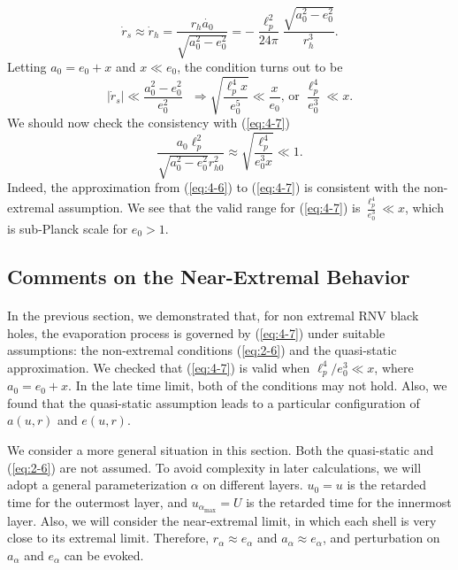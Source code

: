 \documentclass[letterpaper,12pt]{article}
\begin{document}
\begin{equation}\label{eq:4-8}
\dot{r}_{s} \approx \dot{r}_{h} = \frac{r_{h}\dot{a_{0}}}{\sqrt{a_{0}^{2}-e_{0}^{2}}}= -\frac{\ell_{p}^{2}}{24\pi}\frac{\sqrt{a_{0}^{2}-e_{0}^2}}{r_{h}^{3}}.
\end{equation}
Letting $a_{0} = e_{0} + x$ and $x \ll e_{0}$, the condition turns out to be
\begin{equation}\label{eq:4-9}
 |\dot{r}_{s}| \ll \frac{a_{0}^2-e_{0}^2}{e_{0}^2} \textrm{ } \Rightarrow \sqrt{\frac{\ell^{4}_{p}x}{e_{0}^{5}}} \ll \frac{x}{e_{0}} \textrm{, or } \frac{\ell_{p}^{4}}{e_{0}^{3}} \ll x.
 \end{equation}
 We should now check the consistency with (\ref{eq:4-7})
\begin{equation}
\frac{a_{0}\ell_{p}^{2}}{\sqrt{a_{0}^{2}-e_{0}^{2}}r_{h0}^{2}} \approx \sqrt{\frac{\ell_{p}^{4}}{e_{0}^{3}x}} \ll 1.
\end{equation}
Indeed, the approximation from (\ref{eq:4-6}) to (\ref{eq:4-7}) is consistent with the non-extremal assumption. We see that the valid range for (\ref{eq:4-7}) is $\frac{\ell_{p}^{4}}{e_{0}^{3}} \ll x$, which is sub-Planck scale for $e_{0} > 1$. 

\subsection{Comments on the Near-Extremal Behavior}
\label{sec:4-2}
\paragraph{ }
In the previous section, we demonstrated that, for non extremal RNV black holes, the evaporation process is governed by (\ref{eq:4-7}) under suitable assumptions: the non-extremal conditions (\ref{eq:2-6}) and the quasi-static approximation. We checked that (\ref{eq:4-7}) is valid when $\ell_{p}^{4} \slash e_{0}^{3} \ll x$, where $a_{0} = e_{0} + x$. In the late time limit, both of the conditions may not hold. Also, we found that the quasi-static assumption leads to a particular configuration of $a(u, r)$ and $e(u, r)$.

We consider a more general situation in this section. Both the quasi-static and  (\ref{eq:2-6}) are not assumed. To avoid complexity in later calculations, we will adopt a general parameterization $\alpha$ on different layers. $u_{0} = u$ is the retarded time for the outermost layer, and $u_{\alpha_{\textrm{max}}} = U$ is the retarded time for the innermost layer. 
Also, we will consider the near-extremal limit, in which each shell is very close to its extremal limit. Therefore, $r_{\alpha} \approx e_{\alpha}$ and $a_{\alpha} \approx e_{\alpha}$, and perturbation on $a_{\alpha}$ and $e_{\alpha}$ can be evoked. 
\end{document}
